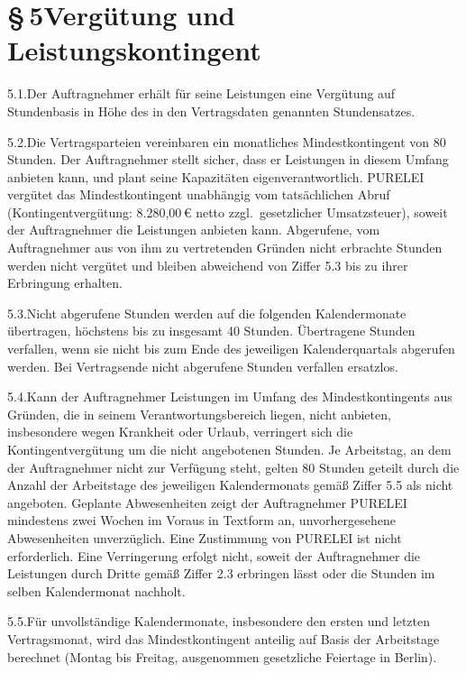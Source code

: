 \documentclass[11pt,a4paper]{article}
\newcommand{\ClientKurzname}{PURELEI}
\newcommand{\Mindeststunden}{80}
\newcommand{\Monatsverguetung}{8.280,00}
\newcommand{\RolloverCap}{40}
\begin{document}
\section{§\,5\quad Vergütung und Leistungskontingent}

5.1.\quad Der Auftragnehmer erhält für seine Leistungen eine Vergütung auf Stundenbasis in Höhe des in den Vertragsdaten genannten Stundensatzes.

5.2.\quad Die Vertragsparteien vereinbaren ein monatliches Mindestkontingent von \Mindeststunden{} Stunden. Der Auftragnehmer stellt sicher, dass er Leistungen in diesem Umfang anbieten kann, und plant seine Kapazitäten eigenverantwortlich. \ClientKurzname{} vergütet das Mindestkontingent unabhängig vom tatsächlichen Abruf (Kontingentvergütung: \Monatsverguetung\,€ netto zzgl.\ gesetzlicher Umsatzsteuer), soweit der Auftragnehmer die Leistungen anbieten kann. Abgerufene, vom Auftragnehmer aus von ihm zu vertretenden Gründen nicht erbrachte Stunden werden nicht vergütet und bleiben abweichend von Ziffer 5.3 bis zu ihrer Erbringung erhalten.

5.3.\quad Nicht abgerufene Stunden werden auf die folgenden Kalendermonate übertragen, höchstens bis zu insgesamt \RolloverCap{} Stunden. Übertragene Stunden verfallen, wenn sie nicht bis zum Ende des jeweiligen Kalenderquartals abgerufen werden. Bei Vertragsende nicht abgerufene Stunden verfallen ersatzlos.

5.4.\quad Kann der Auftragnehmer Leistungen im Umfang des Mindestkontingents aus Gründen, die in seinem Verantwortungsbereich liegen, nicht anbieten, insbesondere wegen Krankheit oder Urlaub, verringert sich die Kontingentvergütung um die nicht angebotenen Stunden. Je Arbeitstag, an dem der Auftragnehmer nicht zur Verfügung steht, gelten \Mindeststunden{} Stunden geteilt durch die Anzahl der Arbeitstage des jeweiligen Kalendermonats gemäß Ziffer 5.5 als nicht angeboten. Geplante Abwesenheiten zeigt der Auftragnehmer \ClientKurzname{} mindestens zwei Wochen im Voraus in Textform an, unvorhergesehene Abwesenheiten unverzüglich. Eine Zustimmung von \ClientKurzname{} ist nicht erforderlich. Eine Verringerung erfolgt nicht, soweit der Auftragnehmer die Leistungen durch Dritte gemäß Ziffer 2.3 erbringen lässt oder die Stunden im selben Kalendermonat nachholt.

5.5.\quad Für unvollständige Kalendermonate, insbesondere den ersten und letzten Vertragsmonat, wird das Mindestkontingent anteilig auf Basis der Arbeitstage berechnet (Montag bis Freitag, ausgenommen gesetzliche Feiertage in Berlin).
\end{document}
